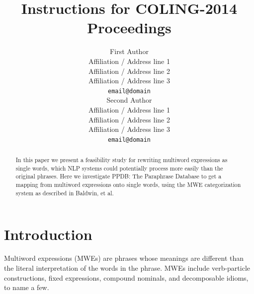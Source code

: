 \documentclass[11pt]{article}
\title{Instructions for COLING-2014 Proceedings}
\author{First Author \\
  Affiliation / Address line 1 \\
  Affiliation / Address line 2 \\
  Affiliation / Address line 3 \\
  {\tt email@domain} \\\And
  Second Author \\
  Affiliation / Address line 1 \\
  Affiliation / Address line 2 \\
  Affiliation / Address line 3 \\
  {\tt email@domain} \\}
\date{}
\begin{document}
\maketitle
\begin{abstract}
In this paper we present a feasibility study for rewriting multiword expressions as single words, which NLP systems could potentially process more easily than the original phrases. Here we investigate PPDB: The Paraphrase Database to get a mapping from multiword expressions onto single words, using the MWE categorization system as described in Baldwin, et al. 
\end{abstract}

\section{Introduction}
\label{intro}

%
% 

Multiword expressions (MWEs) are phrases whose meanings are different than the literal interpretation of the words in the phrase. MWEs include verb-particle constructions, fixed expressions, compound nominals, and decomposable idioms, to name a few. 
\end{document}
